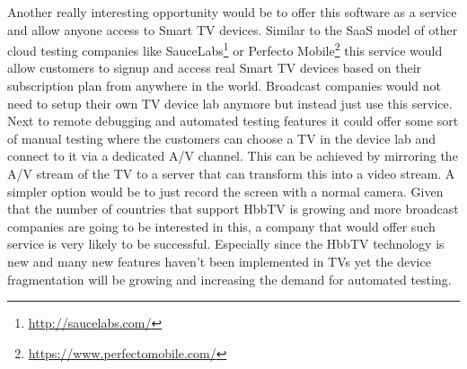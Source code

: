 Another really interesting opportunity would be to offer this software as a service and allow anyone access to Smart TV devices. Similar to the SaaS model of other cloud testing companies like SauceLabs\footnote{\url{http://saucelabs.com/}} or Perfecto Mobile\footnote{\url{https://www.perfectomobile.com/}} this service would allow customers to signup and access real Smart TV devices based on their subscription plan from anywhere in the world. Broadcast companies would not need to setup their own TV device lab anymore but instead just use this service. Next to remote debugging and automated testing features it could offer some sort of manual testing where the customers can choose a TV in the device lab and connect to it via a dedicated A/V channel. This can be achieved by mirroring the A/V stream of the TV to a server that can transform this into a video stream. A simpler option would be to just record the screen with a normal camera. Given that the number of countries that support HbbTV is growing and more broadcast companies are going to be interested in this, a company that would offer such service is very likely to be successful. Especially since the HbbTV technology is new and many new features haven't been implemented in TVs yet the device fragmentation will be growing and increasing the demand for automated testing.
